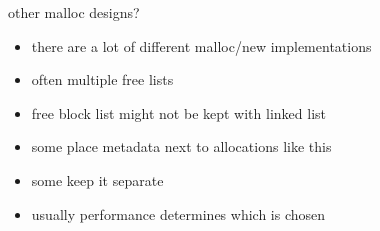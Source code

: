 \begin{frame}{other malloc designs?}
\begin{itemize}
\item there are a lot of different malloc/new implementations
\item often multiple free lists
\item free block list might not be kept with linked list
\vspace{.5cm}
\item some place metadata next to allocations like this
\item some keep it separate
\vspace{.5cm}
\item usually performance determines which is chosen
\end{itemize}
\end{frame}
